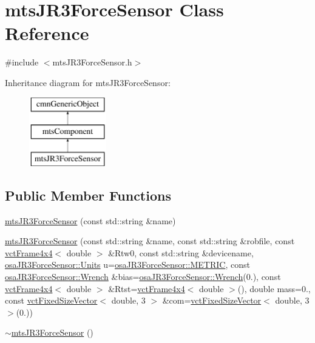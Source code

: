 \hypertarget{classmts_j_r3_force_sensor}{}\section{mts\+J\+R3\+Force\+Sensor Class Reference}
\label{classmts_j_r3_force_sensor}


{\ttfamily \#include $<$mts\+J\+R3\+Force\+Sensor.\+h$>$}

Inheritance diagram for mts\+J\+R3\+Force\+Sensor\+:\begin{figure}[H]
\begin{center}
\leavevmode
\includegraphics[height=3.000000cm]{de/d2c/classmts_j_r3_force_sensor}
\end{center}
\end{figure}
\subsection*{Public Member Functions}
\begin{DoxyCompactItemize}
\item 
\hyperlink{classmts_j_r3_force_sensor_ae258b22c0f978ad9295a2188459db1b3}{mts\+J\+R3\+Force\+Sensor} (const std\+::string \&name)
\item 
\hyperlink{classmts_j_r3_force_sensor_a236dcb35f8862f9a3080cbf7880438e0}{mts\+J\+R3\+Force\+Sensor} (const std\+::string \&name, const std\+::string \&robfile, const \hyperlink{classvct_frame4x4}{vct\+Frame4x4}$<$ double $>$ \&Rtw0, const std\+::string \&devicename, \hyperlink{classosa_j_r3_force_sensor_ac94f1969d4d2089487b912dd0ef7592f}{osa\+J\+R3\+Force\+Sensor\+::\+Units} u=\hyperlink{classosa_j_r3_force_sensor_ac94f1969d4d2089487b912dd0ef7592faf9d1cb83e02904b93520796fff2d9161}{osa\+J\+R3\+Force\+Sensor\+::\+M\+E\+T\+R\+I\+C}, const \hyperlink{classosa_j_r3_force_sensor_afcfc2ba175b2e7ef9f86c6394c8966d2}{osa\+J\+R3\+Force\+Sensor\+::\+Wrench} \&bias=\hyperlink{classosa_j_r3_force_sensor_afcfc2ba175b2e7ef9f86c6394c8966d2}{osa\+J\+R3\+Force\+Sensor\+::\+Wrench}(0.), const \hyperlink{classvct_frame4x4}{vct\+Frame4x4}$<$ double $>$ \&Rtst=\hyperlink{classvct_frame4x4}{vct\+Frame4x4}$<$ double $>$(), double mass=0., const \hyperlink{classvct_fixed_size_vector}{vct\+Fixed\+Size\+Vector}$<$ double, 3 $>$ \&com=\hyperlink{classvct_fixed_size_vector}{vct\+Fixed\+Size\+Vector}$<$ double, 3 $>$(0.))
\item 
\hyperlink{classmts_j_r3_force_sensor_a0b979e1bc6364ded1902aae4fccf4a99}{$\sim$mts\+J\+R3\+Force\+Sensor} ()
\end{DoxyCompactItemize}

